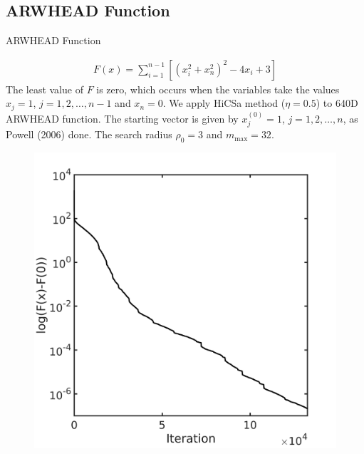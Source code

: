 \documentclass{beamer}
\begin{document}
\subsection{ARWHEAD Function}
\begin{frame}{ARWHEAD Function}

\footnotesize{
\begin{align*}
	F(x) = \sum_{i=1}^{n-1}[(x_i^2+x_n^2)^2 - 4 x_i +3]
\end{align*}
The least value of $F$ is zero, which occurs when the variables take the values
$x_j=1$, $j=1,2,\dots,n-1$ and $x_n=0$. We apply HiCSa method
($\eta=0.5$) to 640D ARWHEAD function.
The starting vector is given by $x_j^{(0)}=1$, $j=1,2,\dots,n$, as
Powell (2006) done. The search radius $\rho_0=3$ and $m_{\max}=32$.
}
%
\begin{figure}[!htbp]
	\centering
	  \includegraphics[scale=0.18]{./figures/arwhead640D.png}

\end{figure}
\end{frame}
\end{document}
